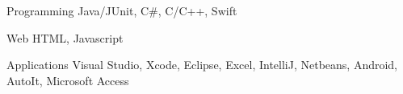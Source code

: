 


\begin{cvskills}


\cvskill
{Programming} %
{Java/JUnit, C#, C/C++, Swift} %


\cvskill
{Web} %
{HTML, Javascript} %


\cvskill
{Applications} %
{Visual Studio, Xcode, Eclipse, Excel, IntelliJ, Netbeans, Android, AutoIt, Microsoft Access} %


\end{cvskills}
